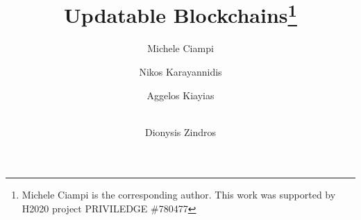 \title{Updatable Blockchains\thanks{Michele Ciampi is the corresponding author. This work  was supported by H2020 project PRIVILEDGE \#780477}}



\author{Michele Ciampi 
	\and   Nikos Karayannidis
	\and Aggelos Kiayias 
        \and \\ Dionysis Zindros 
       }


\maketitle



